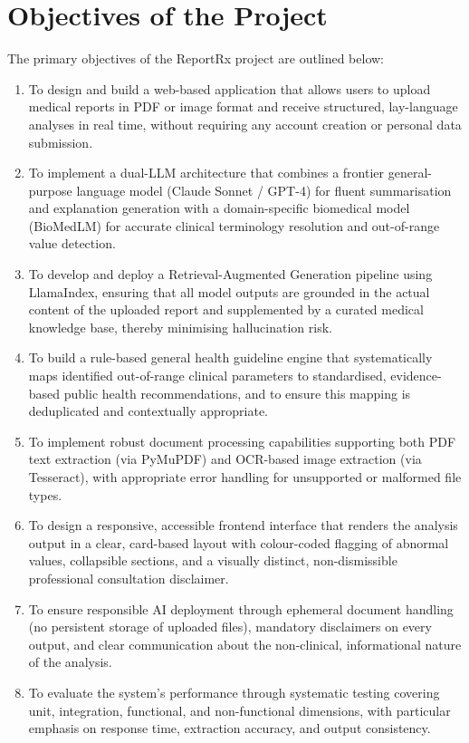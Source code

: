\documentclass[12pt,a4paper]{report}
\begin{document}
\section{Objectives of the Project}
The primary objectives of the ReportRx project are outlined below:

\begin{enumerate}
    \item To design and build a web-based application that allows users to upload medical reports in PDF or image format and receive structured, lay-language analyses in real time, without requiring any account creation or personal data submission.
    \item To implement a dual-LLM architecture that combines a frontier general-purpose language model (Claude Sonnet / GPT-4) for fluent summarisation and explanation generation with a domain-specific biomedical model (BioMedLM) for accurate clinical terminology resolution and out-of-range value detection.
    \item To develop and deploy a Retrieval-Augmented Generation pipeline using LlamaIndex, ensuring that all model outputs are grounded in the actual content of the uploaded report and supplemented by a curated medical knowledge base, thereby minimising hallucination risk.
    \item To build a rule-based general health guideline engine that systematically maps identified out-of-range clinical parameters to standardised, evidence-based public health recommendations, and to ensure this mapping is deduplicated and contextually appropriate.
    \item To implement robust document processing capabilities supporting both PDF text extraction (via PyMuPDF) and OCR-based image extraction (via Tesseract), with appropriate error handling for unsupported or malformed file types.
    \item To design a responsive, accessible frontend interface that renders the analysis output in a clear, card-based layout with colour-coded flagging of abnormal values, collapsible sections, and a visually distinct, non-dismissible professional consultation disclaimer.
    \item To ensure responsible AI deployment through ephemeral document handling (no persistent storage of uploaded files), mandatory disclaimers on every output, and clear communication about the non-clinical, informational nature of the analysis.
    \item To evaluate the system's performance through systematic testing covering unit, integration, functional, and non-functional dimensions, with particular emphasis on response time, extraction accuracy, and output consistency.
\end{enumerate}
\end{document}
